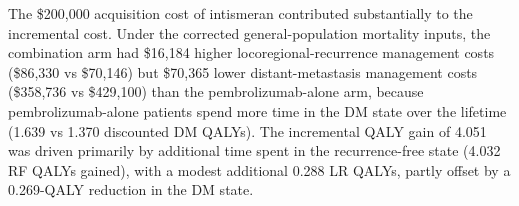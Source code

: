 The \$200,000 acquisition cost of intismeran contributed substantially to the incremental cost. Under the corrected general-population mortality inputs, the combination arm had \$16,184 higher locoregional-recurrence management costs (\$86,330 vs \$70,146) but \$70,365 lower distant-metastasis management costs (\$358,736 vs \$429,100) than the \mbox{pembrolizumab}-alone arm, because \mbox{pembrolizumab}-alone patients spend more time in the DM state over the lifetime (1.639 vs 1.370 discounted DM QALYs). The incremental QALY gain of 4.051 was driven primarily by additional time spent in the recurrence-free state (4.032 RF QALYs gained), with a modest additional 0.288 LR QALYs, partly offset by a 0.269-QALY reduction in the DM state.
